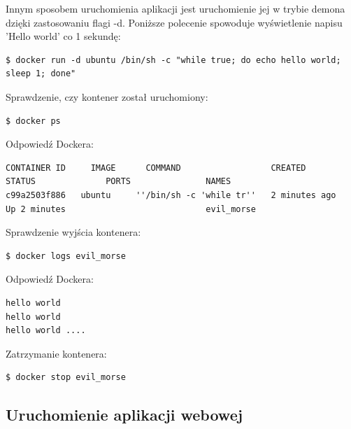 Innym sposobem uruchomienia aplikacji jest uruchomienie jej w trybie demona dzięki zastosowaniu flagi -d. Poniższe polecenie spowoduje wyświetlenie napisu 'Hello world' co 1 sekundę:
\begin{lstlisting}[style=incode]
$ docker run -d ubuntu /bin/sh -c "while true; do echo hello world; 
sleep 1; done"
\end{lstlisting}
Sprawdzenie, czy kontener został uruchomiony: 
\begin{lstlisting}[style=incode]
$ docker ps
\end{lstlisting}
Odpowiedź Dockera:
\begin{lstlisting}[style=incode]
CONTAINER ID     IMAGE      COMMAND                  CREATED             
STATUS              PORTS               NAMES
c99a2503f886   ubuntu     ''/bin/sh -c 'while tr''   2 minutes ago     
Up 2 minutes                            evil_morse
\end{lstlisting}
Sprawdzenie wyjścia kontenera:
\begin{lstlisting}[style=incode]
$ docker logs evil_morse
\end{lstlisting}
Odpowiedź Dockera:
\begin{lstlisting}[style=incode]
hello world
hello world
hello world ....
\end{lstlisting}
Zatrzymanie kontenera:
\begin{lstlisting}[style=incode]
$ docker stop evil_morse
\end{lstlisting}


\subsection{Uruchomienie aplikacji webowej}

